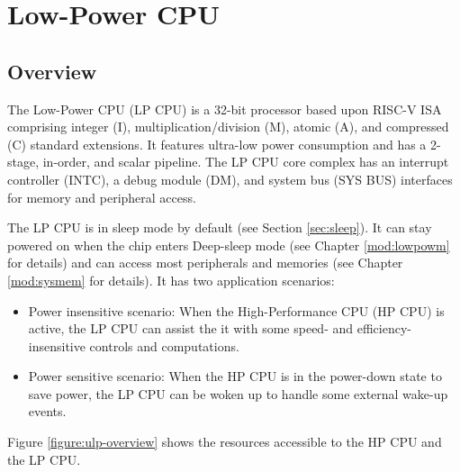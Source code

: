 \documentclass[main\_\_EN.tex]{subfiles}
\begin{document}

\ifglobal
\else
    {\let\clearpage\relax \listoftodos}
    {\let\clearpage\relax \listofdonetodos}
    \tableofcontents
\fi



\hypertarget{ulp}{}
\chapter{Low-Power CPU}
\label{mod:ulp}

\section{Overview}
\label{sec:ulp-intro}

The \chipname{} Low-Power CPU (LP CPU) is a 32-bit processor based upon RISC-V ISA comprising integer (I), multiplication/division (M), atomic (A), and compressed (C) standard extensions. It features ultra-low power consumption and has a 2-stage, in-order, and scalar pipeline. The LP CPU core complex has an interrupt controller (INTC), a debug module (DM), and system bus (SYS BUS) interfaces for memory and peripheral access.

The LP CPU is in sleep mode by default (see Section \ref{sec:sleep}). It can stay powered on when the chip enters Deep-sleep mode (see Chapter \ref{mod:lowpowm} \textit{} for details) and can access most peripherals and memories (see Chapter \ref{mod:sysmem} \textit{} for details). It has two application scenarios:
\begin{itemize}
    \item Power insensitive scenario: When the High-Performance CPU (HP CPU) is active, the LP CPU can assist the it with some speed- and efficiency-insensitive controls and computations.
    \item Power sensitive scenario: When the HP CPU is in the power-down state to save power, the LP CPU can be woken up to handle some external wake-up events.
\end{itemize}

Figure \ref{figure:ulp-overview} shows the resources accessible to the HP CPU and the LP CPU.
\end{document}
